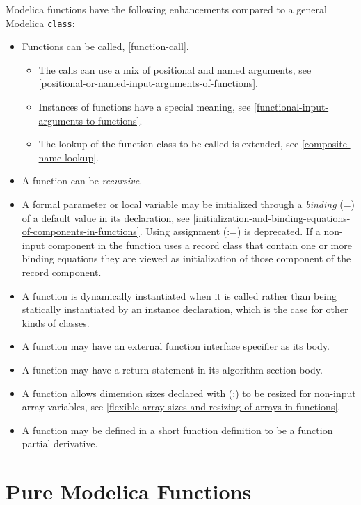 Modelica functions have the following enhancements compared to a general
Modelica \lstinline!class!:
\begin{itemize}
\item
  Functions can be called, \cref{function-call}.

  \begin{itemize}
  \item
    The calls can use a mix of positional and named arguments, see
    \cref{positional-or-named-input-arguments-of-functions}.
  \item
    Instances of functions have a special meaning, see \cref{functional-input-arguments-to-functions}.
  \item
    The lookup of the function class to be called is extended, see
    \cref{composite-name-lookup}.
  \end{itemize}
\item
  A function can be \emph{recursive}.
\item
  A formal parameter or local variable may be initialized through a
  \emph{binding} (=) of a default value in its declaration,
  see \cref{initialization-and-binding-equations-of-components-in-functions}.
  Using assignment (:=) is deprecated. If a non-input component in the
  function uses a record class that contain one or more binding
  equations they are viewed as initialization of those component of the
  record component.
\item
  A function is dynamically instantiated when it is called rather than
  being statically instantiated by an instance declaration, which is the
  case for other kinds of classes.
\item
  A function may have an external function interface specifier as its
  body.
\item
  A function may have a return statement in its algorithm section body.
\item
  A function allows dimension sizes declared with (:) to be resized for
  non-input array variables, see \cref{flexible-array-sizes-and-resizing-of-arrays-in-functions}.
\item
  A function may be defined in a short function definition to be a
  function partial derivative.
\end{itemize}

\section{Pure Modelica Functions}\label{pure-modelica-functions}

